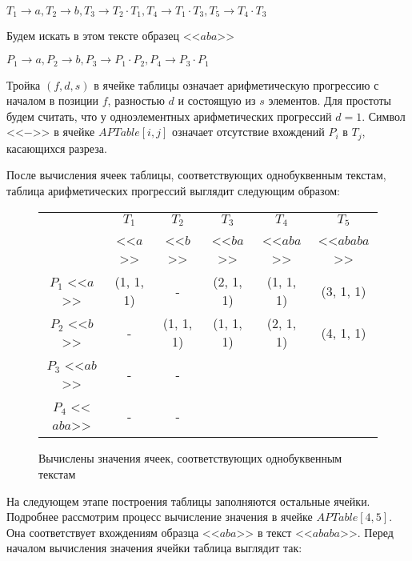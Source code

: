 \documentclass[14pt]{article}
\begin{document}
\begin{center}
$T_1 \to a, T_2 \to b, T_3 \to T_2\cdot T_1, T_4 \to T_1\cdot T_3, T_5 \to T_4\cdot T_3$
\end{center}

Будем искать в этом тексте образец <<$aba$>>

\begin{center}
$P_1 \to a, P_2 \to b, P_3 \to P_1\cdot P_2, P_4 \to P_3\cdot P_1$
\end{center}

Тройка $(f, d, s)$ в ячейке таблицы означает арифметическую прогрессию с началом в
позиции $f$, разностью $d$ и состоящую из $s$ элементов.
Для простоты будем считать, что у одноэлементных арифметических прогрессий $d = 1$.
Символ <<$-$>> в ячейке $APTable[i, j]$ означает отсутствие вхождений $P_i$ в $T_j$, касающихся разреза. 

После вычисления ячеек таблицы, соответствующих однобуквенным текстам, таблица арифметических прогрессий выглядит следующим образом:

\begin{figure}
    \begin{center}
        \begin{tabular}{ | c | c | c | c | c | c |}

        \hline
              & $T_1$ & $T_2$ & $T_3$ & $T_4$ & $T_5$ \\
              & <<$a$>> & <<$b$>> & <<$ba$>> & <<$aba$>> & <<$ababa$>> \\      
        \hline
        $P_1$ <<$a$>> & (1, 1, 1) & - & (2, 1, 1) & (1, 1, 1) & (3, 1, 1) \\
        \hline
        $P_2$ <<$b$>> & - & (1, 1, 1) & (1, 1, 1) & (2, 1, 1) & (4, 1, 1) \\
        \hline
        $P_3$ <<$ab$>> & - & - & & &\\
        \hline
        $P_4$ <<$aba$>> & - & - & & &\\
        \hline
        \end{tabular}
    \end{center}
    \caption{Вычислены значения ячеек, соответствующих однобуквенным текстам}
    \label{ex1}
\end{figure}

На следующем этапе построения таблицы заполняются остальные ячейки.
Подробнее рассмотрим процесс вычисление значения в ячейке $APTable[4, 5]$. Она соответствует вхождениям образца
<<$aba$>> в текст <<$ababa$>>.
Перед началом вычисления значения ячейки таблица выглядит так:
\end{document}
